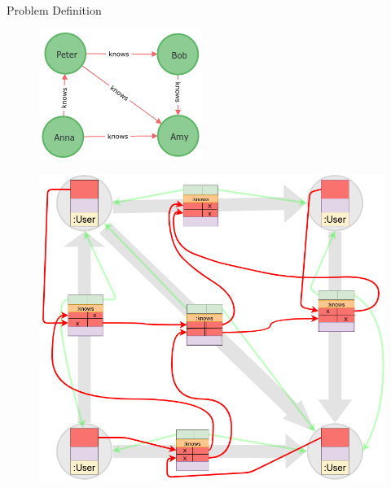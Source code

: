 \documentclass[rgb]{beamer}
\begin{document}
\begin{frame}[allowframebreaks]{Problem Definition}
            \begin{figure}
                \begin{center}
                \includegraphics[keepaspectratio, height=0.6\textheight, width=.6\textwidth]{img/graph.png}
                \end{center}
            \end{figure}
            \end{frame}
            
            \begin{frame}
            \vspace{-3.5em}
            \begin{figure}
                \begin{center}
                \includegraphics[keepaspectratio, height=1.2\textheight, width=\textwidth]{img/example_structs.png}
                \end{center}
            \end{figure}
        \end{frame}
        
\end{document}

